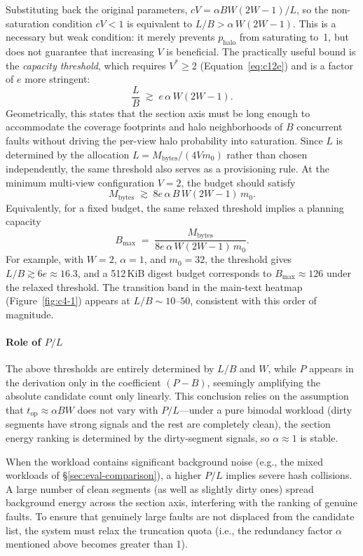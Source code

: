 Substituting back the original parameters, $cV = \alpha BW(2W{-}1)/L$, so the non-saturation condition $cV < 1$ is equivalent to $L/B > \alpha\,W(2W{-}1)$. This is a necessary but weak condition: it merely prevents $p_{\mathrm{halo}}$ from saturating to~1, but does not guarantee that increasing $V$ is beneficial. The practically useful bound is the \emph{capacity threshold}, which requires $V^* \ge 2$ (Equation~\ref{eq:c12e}) and is a factor of $e$ more stringent:
\begin{equation}\label{eq:capacity-threshold}
\frac{L}{B} \;\gtrsim\; e\,\alpha\,W(2W{-}1).
\end{equation}
Geometrically, this states that the section axis must be long enough to accommodate the coverage footprints and halo neighborhoods of $B$ concurrent faults without driving the per-view halo probability into saturation. Since $L$ is determined by the allocation $L = M_{\text{bytes}}/(4Vm_0)$ rather than chosen independently, the same threshold also serves as a provisioning rule. At the minimum multi-view configuration $V{=}2$, the budget should satisfy
\[
M_{\text{bytes}} \;\gtrsim\; 8e\,\alpha\,B\,W(2W{-}1)\,m_0.
\]
Equivalently, for a fixed budget, the same relaxed threshold implies a planning capacity
\[
B_{\max} \;=\; \frac{M_{\text{bytes}}}{8e\,\alpha\,W(2W{-}1)\,m_0}.
\]
For example, with $W{=}2$, $\alpha{=}1$, and $m_0{=}32$, the threshold gives $L/B \gtrsim 6e \approx 16.3$, and a 512\,KiB digest budget corresponds to $B_{\max} \approx 126$ under the relaxed threshold. The transition band in the main-text heatmap (Figure~\ref{fig:c4-1}) appears at $L/B \sim 10$--$50$, consistent with this order of magnitude.

\paragraph{Role of $P/L$}
\label{sec:appendix-PoverL-role}

The above thresholds are entirely determined by $L/B$ and $W$, while $P$ appears in the derivation only in the coefficient $(P{-}B)$, seemingly amplifying the absolute candidate count only linearly. This conclusion relies on the assumption that $t_{\text{op}} \approx \alpha BW$ does not vary with $P/L$---under a pure bimodal workload (dirty segments have strong signals and the rest are completely clean), the section energy ranking is determined by the dirty-segment signals, so $\alpha \approx 1$ is stable.

When the workload contains significant background noise (e.g., the mixed workloads of \S\ref{sec:eval-comparison}), a higher $P/L$ implies severe hash collisions. A large number of clean segments (as well as slightly dirty ones) spread background energy across the section axis, interfering with the ranking of genuine faults. To ensure that genuinely large faults are not displaced from the candidate list, the system must relax the truncation quota (i.e., the redundancy factor $\alpha$ mentioned above becomes greater than 1).

